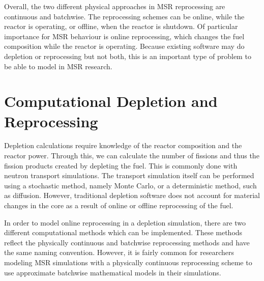 Overall, the two different physical approaches in MSR reprocessing are continuous and batchwise. The reprocessing schemes can be online, while the reactor is operating, or offline, when the reactor is shutdown. Of particular importance for MSR behaviour is online reprocessing, which changes the fuel composition while the reactor is operating.
Because existing software may do depletion or reprocessing but not both, this is an important type of problem to be able to model in MSR research.

\section{Computational Depletion and Reprocessing}

Depletion calculations require knowledge of the reactor composition and the reactor power. Through this, we can calculate the number of fissions and thus the fission products created by depleting the fuel. This is commonly done with neutron transport simulations.
The transport simulation itself can be performed using a stochastic method, namely Monte Carlo, or a deterministic method, such as diffusion.
However, traditional depletion software does not account for material changes in the core as a result of online or offline reprocessing of the fuel.



In order to model online reprocessing in a depletion simulation, there are two different computational methods which can be implemented. These methods reflect the physically continuous and batchwise reprocessing methods and have the same naming convention.
However, it is fairly common for researchers modeling MSR simulations with a physically continuous reprocessing scheme to use approximate batchwise mathematical models in their simulations.

